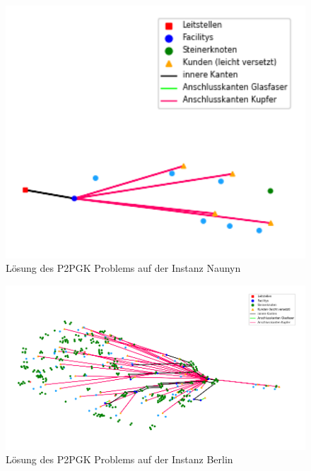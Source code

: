 \documentclass[11pt,a4paper]{article}
\theoremstyle{my_th_style1}
\begin{document}
\begin{figure}[ht]\label{p2pgk_n_pic}
	\begin{center}
		\begin{minipage}{10.0cm}
			\includegraphics[width=1\textwidth]{./Bilder/P2PGK_Naunyn_demand1_duration0}
			\caption{Lösung des P2PGK Problems auf der Instanz Naunyn}
		\end{minipage}
	\end{center}
\end{figure}

\begin{figure}[ht]\label{p2pgk_b_pic}
	\begin{center}
		\begin{minipage}{15.0cm}
			\includegraphics[width=1\textwidth]{./Bilder/P2PGK_Berlin_demand1_duration0}
			\caption{Lösung des P2PGK Problems auf der Instanz Berlin}
		\end{minipage}
	\end{center}
\end{figure}
\end{document}
